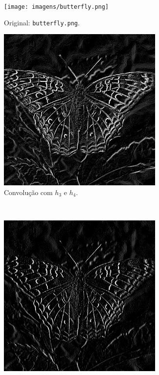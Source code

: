 \begin{figure}[H]
    \centering
    \begin{subfigure}{0.48\textwidth}
        \centering
        \texttt{[image: imagens/butterfly.png]}
        \caption{Original: \texttt{butterfly.png}.}
    \end{subfigure}%
    \begin{subfigure}{0.48\textwidth}
        \centering
        \includegraphics[width=0.9\textwidth]{resultados/butterfly_h3h4.png}
        \caption{Convolução com $h_3$ e $h_4$.}
    \end{subfigure}\\[8pt]
    \begin{subfigure}{0.48\textwidth}
        \centering
        \includegraphics[width=0.9\textwidth]{resultados/butterfly_h3.png}

\end{subfigure}
\end{figure}
